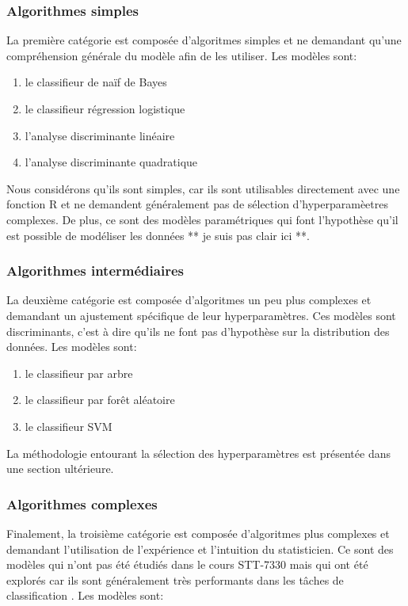 \subsubsection{Algorithmes simples}
La première catégorie est composée d'algoritmes simples et ne demandant qu'une compréhension générale du modèle afin de les utiliser. Les modèles sont:

\begin{enumerate}
  \item le classifieur de naïf de Bayes
  \item le classifieur régression logistique
  \item l'analyse discriminante linéaire
  \item l'analyse discriminante quadratique 
\end{enumerate}

Nous considérons qu'ils sont simples, car ils sont utilisables directement avec une fonction R et ne demandent généralement pas de sélection d'hyperparamèetres complexes. De plus, ce sont des modèles paramétriques qui font l'hypothèse qu'il est possible de modéliser les données ** je suis pas clair ici **. 

\subsubsection{Algorithmes intermédiaires}
La deuxième catégorie est composée d'algoritmes un peu plus complexes et demandant un ajustement spécifique de leur hyperparamètres. Ces modèles sont discriminants, c'est à dire qu'ils ne font pas d'hypothèse sur la distribution des données. Les modèles sont:

\begin{enumerate}
  \item le classifieur par arbre
  \item le classifieur par forêt aléatoire
  \item le classifieur SVM 
\end{enumerate}

La méthodologie entourant la sélection des hyperparamètres est présentée dans une section ultérieure.

\subsubsection{Algorithmes complexes}
Finalement, la troisième catégorie est composée d'algoritmes plus complexes et demandant l'utilisation de l'expérience et l'intuition du statisticien. Ce sont des modèles qui n'ont pas été étudiés dans le cours STT-7330 mais qui ont été explorés car ils sont généralement très performants dans les tâches de classification . Les modèles sont:

